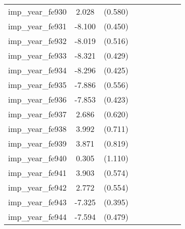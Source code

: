 {\begin{tabular}{l*{4}{cc}}
imp\_year\_fe930&    2.028\sym{***}&  (0.580)&                  &         &                  &         &                  &         \\
imp\_year\_fe931&   -8.100\sym{***}&  (0.450)&                  &         &                  &         &                  &         \\
imp\_year\_fe932&   -8.019\sym{***}&  (0.516)&                  &         &                  &         &                  &         \\
imp\_year\_fe933&   -8.321\sym{***}&  (0.429)&                  &         &                  &         &                  &         \\
imp\_year\_fe934&   -8.296\sym{***}&  (0.425)&                  &         &                  &         &                  &         \\
imp\_year\_fe935&   -7.886\sym{***}&  (0.556)&                  &         &                  &         &                  &         \\
imp\_year\_fe936&   -7.853\sym{***}&  (0.423)&                  &         &                  &         &                  &         \\
imp\_year\_fe937&    2.686\sym{***}&  (0.620)&                  &         &                  &         &                  &         \\
imp\_year\_fe938&    3.992\sym{***}&  (0.711)&                  &         &                  &         &                  &         \\
imp\_year\_fe939&    3.871\sym{***}&  (0.819)&                  &         &                  &         &                  &         \\
imp\_year\_fe940&    0.305         &  (1.110)&                  &         &                  &         &                  &         \\
imp\_year\_fe941&    3.903\sym{***}&  (0.574)&                  &         &                  &         &                  &         \\
imp\_year\_fe942&    2.772\sym{***}&  (0.554)&                  &         &                  &         &                  &         \\
imp\_year\_fe943&   -7.325\sym{***}&  (0.395)&                  &         &                  &         &                  &         \\
imp\_year\_fe944&   -7.594\sym{***}&  (0.479)&                  &         &                  &         &                  &         \\

\end{tabular}}
